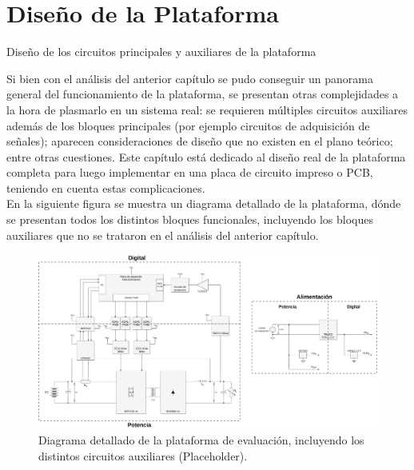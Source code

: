 \section{Diseño de la Plataforma}
\thispagestyle{plain}

\vspace{0.5cm}

\Large\scshape
\begin{center}
    \textrm{Diseño de los circuitos principales y auxiliares de la plataforma}
\end{center}
\normalfont

\divider

Si bien con el análisis del anterior capítulo se pudo conseguir un panorama general del funcionamiento de la plataforma, se presentan otras complejidades a la hora de plasmarlo en un sistema real: se requieren múltiples circuitos auxiliares además de los bloques principales (por ejemplo circuitos de adquisición de señales); aparecen consideraciones de diseño que no existen en el plano teórico; entre otras cuestiones. Este capítulo está dedicado al diseño real de la plataforma completa para luego implementar en una placa de circuito impreso o PCB, teniendo en cuenta estas complicaciones.\\

En la siguiente figura se muestra un diagrama detallado de la plataforma, dónde se presentan todos los distintos bloques funcionales, incluyendo los bloques auxiliares que no se trataron en el análisis del anterior capítulo.\\

\begin{figure}[h]
    \centering
    \includegraphics[scale=0.2]{Imagenes/Plataforma Detallada.pdf}
    \caption{Diagrama detallado de la plataforma de evaluación, incluyendo los distintos circuitos auxiliares (Placeholder).}
    \label{diag_detallado}
\end{figure}

